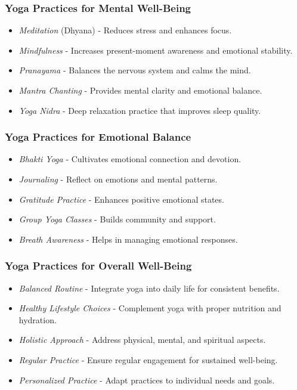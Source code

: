 \begin{frame}[fragile]\frametitle{Yoga Practices for Mental Well-Being}

      \begin{itemize}
		\item \textit{Meditation} (Dhyana) - Reduces stress and enhances focus.
		\item \textit{Mindfulness} - Increases present-moment awareness and emotional stability.
		\item \textit{Pranayama} - Balances the nervous system and calms the mind.
		\item \textit{Mantra Chanting} - Provides mental clarity and emotional balance.
		\item \textit{Yoga Nidra} - Deep relaxation practice that improves sleep quality.
	  \end{itemize}

\end{frame}

\begin{frame}[fragile]\frametitle{Yoga Practices for Emotional Balance}

      \begin{itemize}
		\item \textit{Bhakti Yoga} - Cultivates emotional connection and devotion.
		\item \textit{Journaling} - Reflect on emotions and mental patterns.
		\item \textit{Gratitude Practice} - Enhances positive emotional states.
		\item \textit{Group Yoga Classes} - Builds community and support.
		\item \textit{Breath Awareness} - Helps in managing emotional responses.
	  \end{itemize}

\end{frame}

\begin{frame}[fragile]\frametitle{Yoga Practices for Overall Well-Being}

      \begin{itemize}
		\item \textit{Balanced Routine} - Integrate yoga into daily life for consistent benefits.
		\item \textit{Healthy Lifestyle Choices} - Complement yoga with proper nutrition and hydration.
		\item \textit{Holistic Approach} - Address physical, mental, and spiritual aspects.
		\item \textit{Regular Practice} - Ensure regular engagement for sustained well-being.
		\item \textit{Personalized Practice} - Adapt practices to individual needs and goals.
	  \end{itemize}

\end{frame}



